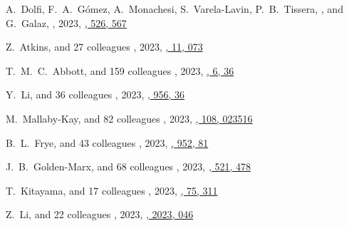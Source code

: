\begin{etaremune}
\item
A.~Dolfi, F.~A.~Gómez, A.~Monachesi, S.~Varela-Lavin, P.~B.~Tissera, \myself, and G.~Galaz,
,
2023, \href{https://ui.adsabs.harvard.edu/abs/2023MNRAS.526..567D}{\mnras, 526, 567}

\item
Z.~Atkins, and 27 colleagues
,
2023, \href{https://ui.adsabs.harvard.edu/abs/2023JCAP...11..073A/abstract}{\jcap, 11, 073}

\item
T.~M.~C.~Abbott, and 159 colleagues
,
2023, \href{https://ui.adsabs.harvard.edu/abs/2023OJAp....6E..36A}{\oja, 6, 36}

\item
Y.~Li, and 36 colleagues
,
2023, \href{https://ui.adsabs.harvard.edu/abs/2023ApJ...956...36L}{\apj, 956, 36}

\item
M.~Mallaby-Kay, and 82 colleagues
,
2023, \href{https://ui.adsabs.harvard.edu/abs/2023PhRvD.108b3516M}{\prd, 108, 023516}

\item
B.~L.~Frye, and 43 colleagues
,
2023, \href{https://ui.adsabs.harvard.edu/abs/2023ApJ...952...81F}{\apj, 952, 81}

\item
J.~B.~Golden-Marx, and 68 colleagues
,
2023, \href{https://ui.adsabs.harvard.edu/abs/2023MNRAS.521..478G}{\mnras, 521, 478}

\item
T.~Kitayama, and 17 colleagues
,
2023, \href{https://ui.adsabs.harvard.edu/abs/2023PASJ...75..311K}{\pasj, 75, 311}

\item
Z.~Li, and 22 colleagues
,
2023, \href{https://ui.adsabs.harvard.edu/abs/2023JCAP...02..046L}{\jcap, 2023, 046}


\end{etaremune}
